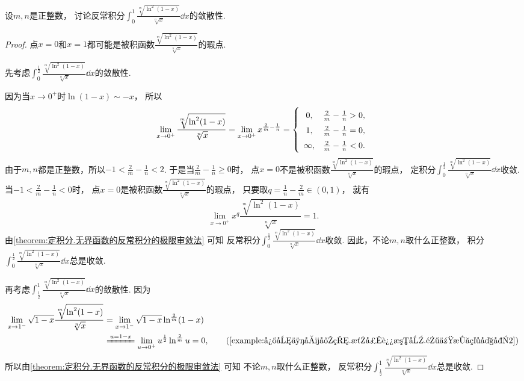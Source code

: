 \begin{example}
设\(m,n\)是正整数，
讨论反常积分\(\int_0^1 \frac{\sqrt[m]{\ln^2(1-x)}}{\sqrt[n]{x}} \dd{x}\)的敛散性.
\begin{proof}
点\(x=0\)和\(x=1\)都可能是被积函数\(\frac{\sqrt[m]{\ln^2(1-x)}}{\sqrt[n]{x}}\)的瑕点.

先考虑\(\int_0^{\frac12} \frac{\sqrt[m]{\ln^2(1-x)}}{\sqrt[n]{x}} \dd{x}\)的敛散性.

因为当\(x\to0^+\)时\(\ln(1-x) \sim -x\)，
所以\begin{equation*}
	\lim_{x\to0^+} \frac{\sqrt[m]{\ln^2(1-x)}}{\sqrt[n]{x}}
	= \lim_{x\to0^+} x^{\frac2m-\frac1n}
	= \left\{ \def\arraystretch{1.5} \begin{array}{cl}
		0, & \frac2m-\frac1n>0, \\
		1, & \frac2m-\frac1n=0, \\
		\infty, & \frac2m-\frac1n<0.
	\end{array} \right.
\end{equation*}
由于\(m,n\)都是正整数，所以\(-1<\frac2m-\frac1n<2\).
于是当\(\frac2m-\frac1n\geq0\)时，
点\(x=0\)不是被积函数\(\frac{\sqrt[m]{\ln^2(1-x)}}{\sqrt[n]{x}}\)的瑕点，
定积分\(\int_0^{\frac12} \frac{\sqrt[m]{\ln^2(1-x)}}{\sqrt[n]{x}} \dd{x}\)收敛.
当\(-1<\frac2m-\frac1n<0\)时，
点\(x=0\)是被积函数\(\frac{\sqrt[m]{\ln^2(1-x)}}{\sqrt[n]{x}}\)的瑕点，
只要取\(q=\frac1n-\frac2m\in(0,1)\)，
就有\begin{equation*}
	\lim_{x\to0^+} x^q \frac{\sqrt[m]{\ln^2(1-x)}}{\sqrt[n]{x}} = 1.
\end{equation*}
由\cref{theorem:定积分.无界函数的反常积分的极限审敛法} 可知
反常积分\(\int_0^{\frac12} \frac{\sqrt[m]{\ln^2(1-x)}}{\sqrt[n]{x}} \dd{x}\)收敛.
因此，不论\(m,n\)取什么正整数，
积分\(\int_0^{\frac12} \frac{\sqrt[m]{\ln^2(1-x)}}{\sqrt[n]{x}} \dd{x}\)总是收敛.

再考虑\(\int_{\frac12}^1 \frac{\sqrt[m]{\ln^2(1-x)}}{\sqrt[n]{x}} \dd{x}\)的敛散性.
因为\begin{align*}
	\lim_{x\to1^-} \sqrt{1-x} \frac{\sqrt[m]{\ln^2(1-x)}}{\sqrt[n]{x}}
	&= \lim_{x\to1^-} \sqrt{1-x} \ln^{\frac2m}(1-x) \\
	&\xlongequal{u=1-x}
	\lim_{u\to0^+} u^{\frac12} \ln^{\frac2m} u
	= 0, \tag{\cref{example:微分中值定理.洛必达法则.零乘无穷大型2}}
\end{align*}
所以由\cref{theorem:定积分.无界函数的反常积分的极限审敛法} 可知
不论\(m,n\)取什么正整数，
反常积分\(\int_{\frac12}^1 \frac{\sqrt[m]{\ln^2(1-x)}}{\sqrt[n]{x}} \dd{x}\)总是收敛.
\end{proof}
\end{example}
